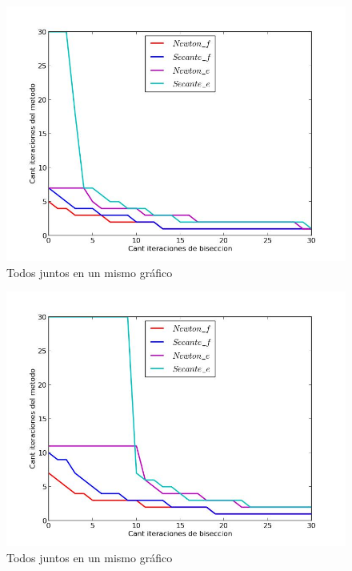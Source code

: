 \begin{figure}[!h]
	\begin{center}
		  \includegraphics[keepaspectratio]{../Imagenes/exp4/experimento_biseccion_3.jpg}
		  \caption{Todos juntos en un mismo gráfico}
		  \label{fig:contra1}
	\end{center}
\end{figure}
\FloatBarrier

\begin{figure}[!h]
	\begin{center}
		  \includegraphics[keepaspectratio]{../Imagenes/exp4/experimento_biseccion_4.jpg}
		  \caption{Todos juntos en un mismo gráfico}
		  \label{fig:contra1}
	\end{center}
\end{figure}
\FloatBarrier

